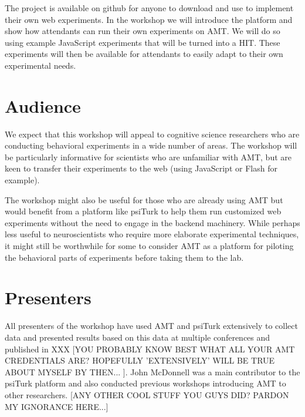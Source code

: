 \documentclass[10pt,letterpaper]{article}
\begin{document}
The project is available on github for anyone to download and use to implement their own web experiments.  In the workshop we will introduce the platform and show how attendants can run their own experiments on AMT. 
We will do so using example JavaScript experiments that will be turned into a HIT.
These experiments will then be available for attendants to easily adapt to their own experimental needs.


 \section{Audience}
 We expect that this workshop will appeal to cognitive science researchers who are conducting behavioral experiments in a wide number of areas. The workshop will be particularly informative for scientists who are unfamiliar with AMT, but are keen to transfer their experiments to  the web (using JavaScript or Flash for example). 
 
  The workshop might also be useful for those who are already using AMT but would benefit from a platform like psiTurk to help them run customized web experiments without the need to engage in the backend machinery. While perhaps less useful to neuroscientists who  require more elaborate experimental techniques, it might still be worthwhile for some to consider AMT as a platform for piloting the behavioral parts of experiments before taking them to the lab.
 
   
\section{Presenters}

All presenters of the workshop have used AMT and psiTurk extensively to collect data and presented results based on this data at multiple conferences and published in XXX  [YOU PROBABLY KNOW BEST WHAT ALL YOUR AMT CREDENTIALS ARE? HOPEFULLY 'EXTENSIVELY' WILL BE TRUE ABOUT MYSELF BY THEN... ]. John McDonnell was a main contributor to the psiTurk platform and also conducted previous workshops introducing AMT to other researchers. [ANY OTHER COOL STUFF YOU GUYS DID? PARDON MY IGNORANCE HERE...]





\setlength{\bibleftmargin}{.125in}
\setlength{\bibindent}{-\bibleftmargin}



\todos
\end{document}
